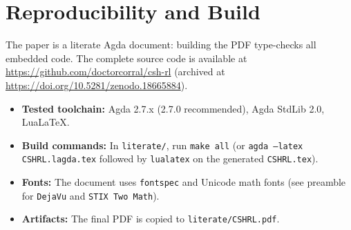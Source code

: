 \documentclass[9pt,a4paper]{article}
\theoremstyle{plain}
\theoremstyle{definition}
\theoremstyle{remark}
\begin{document}
\section{Reproducibility and Build}

The paper is a literate Agda document: building the PDF type-checks all embedded code.
The complete source code is available at \url{https://github.com/doctorcorral/csh-rl} (archived at \url{https://doi.org/10.5281/zenodo.18665884}).

\begin{itemize}
\item \textbf{Tested toolchain:} Agda 2.7.x (2.7.0 recommended), Agda StdLib 2.0, Lua\LaTeX.
\item \textbf{Build commands:} In \texttt{literate/}, run \texttt{make all} (or \texttt{agda --latex CSHRL.lagda.tex} followed by \texttt{lualatex} on the generated \texttt{CSHRL.tex}).
\item \textbf{Fonts:} The document uses \texttt{fontspec} and Unicode math fonts (see preamble for \texttt{DejaVu} and \texttt{STIX Two Math}).
\item \textbf{Artifacts:} The final PDF is copied to \texttt{literate/CSHRL.pdf}.
\end{itemize}
\end{document}
